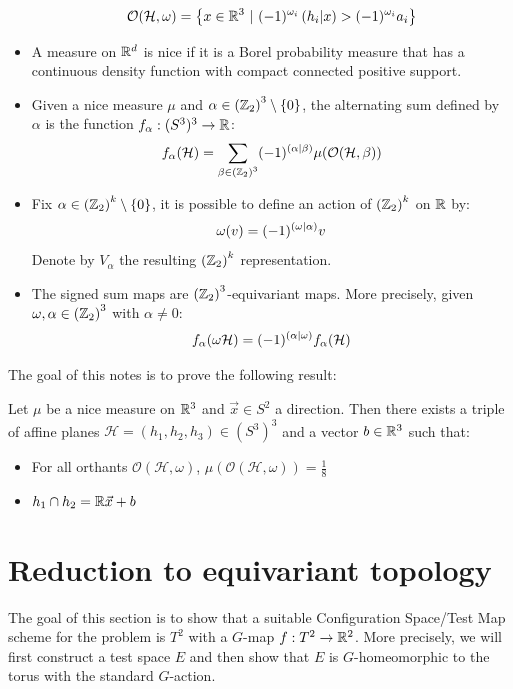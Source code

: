\documentclass[10pt]{article}
\begin{document}
\begin{itemize}
    \[
      \mathcal{O}(\mathcal{H}, \omega) = \left\{ x\in \mathbb{R}^3 \  \vert \ (-1)^{\omega_i}\left( h_i \vert x\right) > (-1)^{\omega_i}a_i \right\}
    \]
  \item A measure on $\mathbb{R}^d$ is nice if it is a Borel probability measure that has a continuous density function with compact connected positive support.
  \item Given a nice measure $\mu$ and $\alpha \in \left(\mathbb{Z}_2\right)^3 \setminus \left\{0\right\}$, the alternating sum defined by $\alpha$ is the function $f_\alpha:(S^3)^3\rightarrow \mathbb{R}$:
    \[
      f_\alpha(\mathcal{H}) = \sum_{\beta\in \left(\mathbb{Z}_2\right)^3} (-1)^{\left( \alpha \vert \beta\right)}\mu(\mathcal{O}(\mathcal{H}, \beta))
    \]
  \item Fix $\alpha\in \left(\mathbb{Z}_2\right)^k\setminus \left\{0\right\}$, it is possible to define an action of $\left(\mathbb{Z}_2\right)^k$ on $\mathbb{R}$ by:
    \[
      \omega(v) = (-1)^{\left( \omega \vert \alpha\right)}v
    \]
    Denote by $V_\alpha$ the resulting $\left(\mathbb{Z}_2\right)^k$ representation.
  \item The signed sum maps are $\left(\mathbb{Z}_2\right)^3$-equivariant maps. More precisely, given $\omega, \alpha \in \left(\mathbb{Z}_2\right)^3$ with $\alpha \neq 0$:
    \[
      f_\alpha(\omega \mathcal{H}) = (-1)^{\left( \alpha \vert \omega\right)}f_\alpha(\mathcal{H})
    \]
\end{itemize}

The goal of this notes is to prove the following result:
\begin{theorem}
  Let $\mu$ be a nice measure on $\mathbb{R}^3$ and $\vec{x} \in S^2$ a direction. Then there exists a triple of affine planes $ \mathcal{H}=(h_1, h_2, h_3) \in (S^3)^3$ and a vector $b\in \mathbb{R}^3$ such that:
  \begin{itemize}
  \item For all orthants $\mathcal{O}(\mathcal{H}, \omega)$, $\mu(\mathcal{O}(\mathcal{H}, \omega)) = \frac{1}{8}$
  \item $h_1 \cap h_2 = \mathbb{R} \vec{x} + b$
  \end{itemize}
\end{theorem}

\section{Reduction to equivariant topology}\label{sec:torus_conf_space}
The goal of this section is to show that a suitable Configuration Space/Test Map scheme for the problem is $T^2$ with a $G$-map $f:T^2 \rightarrow \mathbb{R}^2$. More precisely, we will first construct a test space $E$ and then show that $E$ is $G$-homeomorphic to the torus with the standard $G$-action.
\end{document}
